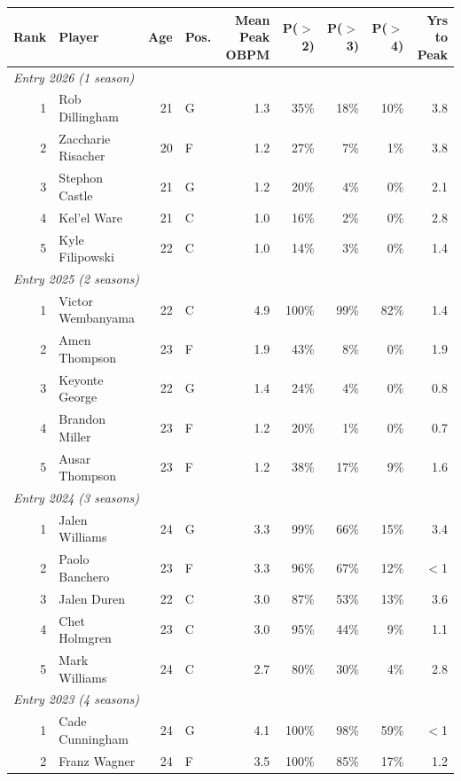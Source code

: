 \begin{table}[htbp]
  \centering\small
  \begin{tabular}{rlrlrrrrr}
    \toprule
    Rank & Player & Age & Pos. & Mean Peak OBPM & P($>$2) & P($>$3) & P($>$4) & Yrs to Peak \\
    \midrule
    \multicolumn{9}{l}{\textit{Entry 2026 (1 season)}} \\
    \midrule
    1 & Rob Dillingham & 21 & G & 1.3 & 35\% & 18\% & 10\% & 3.8 \\
    2 & Zaccharie Risacher & 20 & F & 1.2 & 27\% & 7\% & 1\% & 3.8 \\
    3 & Stephon Castle & 21 & G & 1.2 & 20\% & 4\% & 0\% & 2.1 \\
    4 & Kel'el Ware & 21 & C & 1.0 & 16\% & 2\% & 0\% & 2.8 \\
    5 & Kyle Filipowski & 22 & C & 1.0 & 14\% & 3\% & 0\% & 1.4 \\
    \midrule[0.4pt]
    \multicolumn{9}{l}{\textit{Entry 2025 (2 seasons)}} \\
    \midrule
    1 & Victor Wembanyama & 22 & C & 4.9 & 100\% & 99\% & 82\% & 1.4 \\
    2 & Amen Thompson & 23 & F & 1.9 & 43\% & 8\% & 0\% & 1.9 \\
    3 & Keyonte George & 22 & G & 1.4 & 24\% & 4\% & 0\% & 0.8 \\
    4 & Brandon Miller & 23 & F & 1.2 & 20\% & 1\% & 0\% & 0.7 \\
    5 & Ausar Thompson & 23 & F & 1.2 & 38\% & 17\% & 9\% & 1.6 \\
    \midrule[0.4pt]
    \multicolumn{9}{l}{\textit{Entry 2024 (3 seasons)}} \\
    \midrule
    1 & Jalen Williams & 24 & G & 3.3 & 99\% & 66\% & 15\% & 3.4 \\
    2 & Paolo Banchero & 23 & F & 3.3 & 96\% & 67\% & 12\% & $<$1 \\
    3 & Jalen Duren & 22 & C & 3.0 & 87\% & 53\% & 13\% & 3.6 \\
    4 & Chet Holmgren & 23 & C & 3.0 & 95\% & 44\% & 9\% & 1.1 \\
    5 & Mark Williams & 24 & C & 2.7 & 80\% & 30\% & 4\% & 2.8 \\
    \midrule[0.4pt]
    \multicolumn{9}{l}{\textit{Entry 2023 (4 seasons)}} \\
    \midrule
    1 & Cade Cunningham & 24 & G & 4.1 & 100\% & 98\% & 59\% & $<$1 \\
    2 & Franz Wagner & 24 & F & 3.5 & 100\% & 85\% & 17\% & 1.2 \\

\end{tabular}
\end{table}
